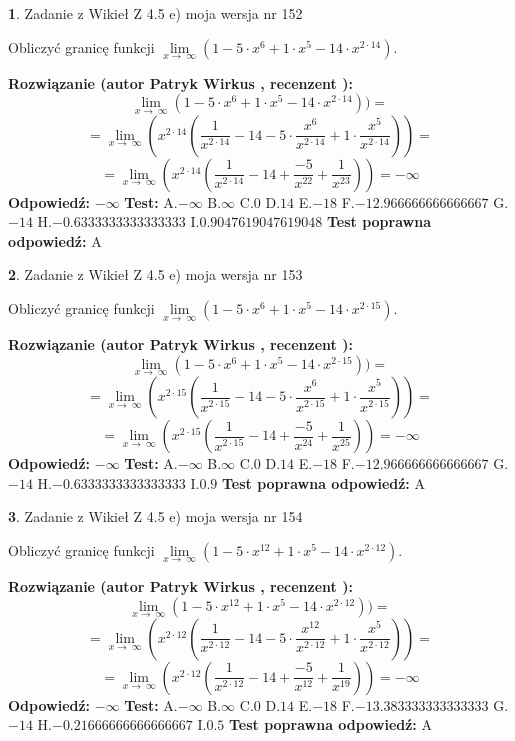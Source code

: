 \documentclass[12pt, a4paper]{article}
\theoremstyle{definition} %
\newtheorem{zad}{}
\newcommand{\zadStart}[1]{\begin{zad}#1\newline}
\newcommand{\zadStop}{\end{zad}}
\newcommand{\rozwStart}[2]{\noindent \textbf{Rozwiązanie (autor #1 , recenzent #2): }\newline}
\newcommand{\rozwStop}{\newline}
\newcommand{\odpStart}{\noindent \textbf{Odpowiedź:}\newline}
\newcommand{\odpStop}{\newline}
\newcommand{\testStart}{\noindent \textbf{Test:}\newline}
\newcommand{\testStop}{\newline}
\newcommand{\kluczStart}{\noindent \textbf{Test poprawna odpowiedź:}\newline}
\newcommand{\kluczStop}{\newline}
\begin{document}
\zadStart{Zadanie z Wikieł Z 4.5 e) moja wersja nr 152}


Obliczyć granicę funkcji  $\lim\limits_{x\to\ \infty}(1 - 5 \cdot x^{6}+1 \cdot x^{5}- 14 \cdot x^{2\cdot14})$.
\zadStop
\rozwStart{Patryk Wirkus}{}
$$\lim\limits_{x\to\ \infty}(1 - 5 \cdot x^{6}+1 \cdot x^{5}- 14 \cdot x^{2\cdot14}))=$$
$$=\lim\limits_{x\to\ \infty}(x^{2\cdot14}(\frac{1}{x^{2\cdot14}}-14 -5 \cdot \frac{x^{6}}{x^{2\cdot14}}+1 \cdot \frac{x^{5}}{x^{2\cdot14}}))=$$
$$=\lim\limits_{x\to\ \infty}(x^{2\cdot14}(\frac{1}{x^{2\cdot14}}-14 + \frac{-5}{x^{22}}+ \frac{1}{x^{23}}))=-\infty$$
\rozwStop
\odpStart
$-\infty$
\odpStop
\testStart
A.$-\infty$ B.$\infty$ C.$0$ D.$14$ E.$-18$
F.$-12.966666666666667$ G.$-14$
H.$-0.6333333333333333$
I.$0.9047619047619048$
\testStop
\kluczStart
A
\kluczStop



\zadStart{Zadanie z Wikieł Z 4.5 e) moja wersja nr 153}


Obliczyć granicę funkcji  $\lim\limits_{x\to\ \infty}(1 - 5 \cdot x^{6}+1 \cdot x^{5}- 14 \cdot x^{2\cdot15})$.
\zadStop
\rozwStart{Patryk Wirkus}{}
$$\lim\limits_{x\to\ \infty}(1 - 5 \cdot x^{6}+1 \cdot x^{5}- 14 \cdot x^{2\cdot15}))=$$
$$=\lim\limits_{x\to\ \infty}(x^{2\cdot15}(\frac{1}{x^{2\cdot15}}-14 -5 \cdot \frac{x^{6}}{x^{2\cdot15}}+1 \cdot \frac{x^{5}}{x^{2\cdot15}}))=$$
$$=\lim\limits_{x\to\ \infty}(x^{2\cdot15}(\frac{1}{x^{2\cdot15}}-14 + \frac{-5}{x^{24}}+ \frac{1}{x^{25}}))=-\infty$$
\rozwStop
\odpStart
$-\infty$
\odpStop
\testStart
A.$-\infty$ B.$\infty$ C.$0$ D.$14$ E.$-18$
F.$-12.966666666666667$ G.$-14$
H.$-0.6333333333333333$
I.$0.9$
\testStop
\kluczStart
A
\kluczStop



\zadStart{Zadanie z Wikieł Z 4.5 e) moja wersja nr 154}


Obliczyć granicę funkcji  $\lim\limits_{x\to\ \infty}(1 - 5 \cdot x^{12}+1 \cdot x^{5}- 14 \cdot x^{2\cdot12})$.
\zadStop
\rozwStart{Patryk Wirkus}{}
$$\lim\limits_{x\to\ \infty}(1 - 5 \cdot x^{12}+1 \cdot x^{5}- 14 \cdot x^{2\cdot12}))=$$
$$=\lim\limits_{x\to\ \infty}(x^{2\cdot12}(\frac{1}{x^{2\cdot12}}-14 -5 \cdot \frac{x^{12}}{x^{2\cdot12}}+1 \cdot \frac{x^{5}}{x^{2\cdot12}}))=$$
$$=\lim\limits_{x\to\ \infty}(x^{2\cdot12}(\frac{1}{x^{2\cdot12}}-14 + \frac{-5}{x^{12}}+ \frac{1}{x^{19}}))=-\infty$$
\rozwStop
\odpStart
$-\infty$
\odpStop
\testStart
A.$-\infty$ B.$\infty$ C.$0$ D.$14$ E.$-18$
F.$-13.383333333333333$ G.$-14$
H.$-0.21666666666666667$
I.$0.5$
\testStop
\kluczStart
A
\kluczStop
\end{document}
